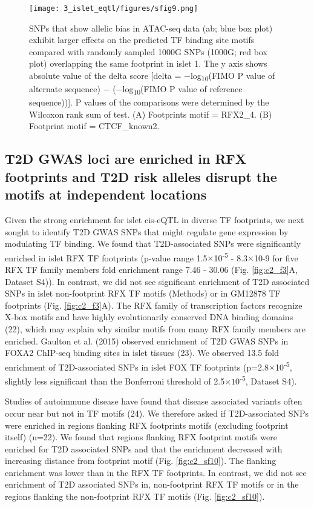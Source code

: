 \begin{figure}
    \centering
    \texttt{[image: 3\_islet\_eqtl/figures/sfig9.png]}
    \caption[SNPs that show allelic bias in ATAC-seq data]{SNPs that show allelic bias in ATAC-seq data (ab; blue box plot) exhibit larger effects on the predicted TF binding site motifs compared with randomly sampled 1000G SNPs (1000G; red box plot) overlapping the same footprint in islet 1. The y axis shows absolute value of the delta score [delta = −log\textsubscript{10}(FIMO P value of alternate sequence) − (−log\textsubscript{10}(FIMO P value of reference sequence))]. P values of the comparisons were determined by the Wilcoxon rank sum of test. (A) Footprints motif = RFX2\_4. (B) Footprint motif = CTCF\_known2.}
    \label{fig:c2_sf9}
\end{figure}

\subsection{T2D GWAS loci are enriched in RFX footprints and T2D risk alleles disrupt the motifs at independent locations}
Given the strong enrichment for islet cis-eQTL in diverse TF footprints, we next sought to identify T2D GWAS SNPs that might regulate gene expression by modulating TF binding. We found that T2D-associated SNPs were significantly enriched in islet RFX TF footprints (p-value range 1.5$\times$10\textsuperscript{-5} - 8.3$\times$10-9 for five RFX TF family members fold enrichment range 7.46 - 30.06 (Fig. \ref{fig:c2_f3}A, Dataset S4)). In contrast, we did not see significant enrichment of T2D associated SNPs in islet non-footprint RFX TF motifs (Methods) or in GM12878 TF footprints (Fig. \ref{fig:c2_f3}A). The RFX family of transcription factors recognize X-box motifs and have highly evolutionarily conserved DNA binding domains (22), which may explain why similar motifs from many RFX family members are enriched. Gaulton et al. (2015) observed enrichment of T2D GWAS SNPs in FOXA2 ChIP-seq binding sites in islet tissues (23). We observed 13.5 fold enrichment of T2D-associated SNPs in islet FOX TF footprints (p=2.8$\times$10\textsuperscript{-5}, slightly less significant than the Bonferroni threshold of 2.5$\times10$\textsuperscript{-5}, Dataset S4). 

Studies of autoimmune disease have found that disease associated variants often occur near but not in TF motifs (24). We therefore asked if T2D-associated SNPs were enriched in regions flanking RFX footprints motifs (excluding footprint itself) (n=22). We found that regions flanking RFX footprint motifs were enriched for T2D associated SNPs and that the enrichment decreased with increasing distance from footprint motif (Fig. \ref{fig:c2_sf10}). The flanking enrichment was lower than in the RFX TF footprints. In contrast, we did not see enrichment of T2D associated SNPs in, non-footprint RFX TF motifs or in the regions flanking the non-footprint RFX TF motifs (Fig. \ref{fig:c2_sf10}).

